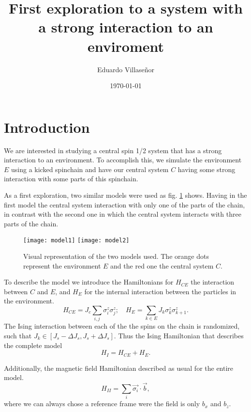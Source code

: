 \documentclass[twocolumn,floatfix]{article}
\title{First exploration to a system with a strong interaction to an enviroment}
\author{Eduardo Villase\~nor}
\date{\today}
\begin{document}
\maketitle



\section{Introduction}

We are interested in studying a central spin 1/2 system that has a strong interaction to an 
environment. To accomplish this, we simulate the environment $E$ using a kicked spinchain and have
our central system $C$ having some strong interaction with some parts of this spinchain.

As a first exploration, two similar models were used as fig. \ref{models} shows. Having in the
first model the central system interaction with only one of the parts of the chain, in contrast
with the second one in which the central system interacts with three parts of the chain.


\begin{figure}[H]
\begin{center}
\texttt{[image: model1]} \hfill
\texttt{[image: model2]} 
\end{center}
\caption{Visual representation of the two models used. The orange dots
represent the environment $E$ and the red one the central system $C$.}
\label{models}
\end{figure}

To describe the model we introduce the Hamiltonians for $H_{CE}$ the interaction between $C$ and $E$, and $H_{E}$ for the internal interaction 
between the particles in the environment.
\begin{equation}
H_{CE}=J_c\sum_{i,j} \sigma_i^z \sigma_j^z; \quad H_{E}=  \sum_{k \in E} J_{k} \sigma_{k}^z \sigma_{k+1}^z.
\end{equation}
The Ising interaction between each of the the spins on the chain is randomized,
such that $J_k \in [J_s-\Delta J_s,J_s+\Delta J_s]$.
Thus the Ising Hamiltonian that describes the complete model
\begin{equation}
H_{I}=H_{CE} + H_{E}.
\end{equation}

Additionally, the magnetic field Hamiltonian described as usual for the entire model.
\begin{equation}
H_{II}=\sum_{i} \vec{\sigma_i} \cdot \vec{b},
\end{equation}
where we can always chose a reference frame were the field is only $b_x$ and $b_z$.
\end{document}
